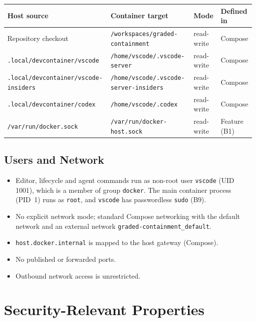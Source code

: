 \documentclass[11pt,a4paper]{article}
\newcommand{\fpath}[1]{\texttt{#1}}
\begin{document}
\begin{table}[H]
\small
\footnotesize
\begin{tabularx}{\linewidth}{@{}p{4.6cm}p{5.4cm}p{1.6cm}L@{}}
\toprule
\textbf{Host source} & \textbf{Container target} & \textbf{Mode} & \textbf{Defined in} \\
\midrule
Repository checkout & \fpath{/workspaces/graded-containment} & read-write & Compose \\
\fpath{.local/devcontainer/vscode} & \fpath{/home/vscode/.vscode-server} & read-write & Compose \\
\fpath{.local/devcontainer/}\allowbreak\fpath{vscode-insiders} & \fpath{/home/vscode/}\allowbreak\fpath{.vscode-server-insiders} & read-write & Compose \\
\fpath{.local/devcontainer/codex} & \fpath{/home/vscode/.codex} & read-write & Compose \\
\fpath{/var/run/docker.sock} & \fpath{/var/run/docker-host.sock} & read-write & Feature (B1) \\
\bottomrule
\end{tabularx}
\end{table}

\subsection{Users and Network}

\begin{itemize}
  \item Editor, lifecycle and agent commands run as non-root user \texttt{vscode} (UID 1001), which is a member of group \texttt{docker}. The main container process (PID~1) runs as \texttt{root}, and \texttt{vscode} has passwordless \texttt{sudo} (B9).
  \item No explicit network mode; standard Compose networking with the default network and an external network \fpath{graded-containment\_default}.
  \item \texttt{host.docker.internal} is mapped to the host gateway (Compose).
  \item No published or forwarded ports.
  \item Outbound network access is unrestricted.
\end{itemize}

\section{Security-Relevant Properties}
\label{sec:findings}
\end{document}

